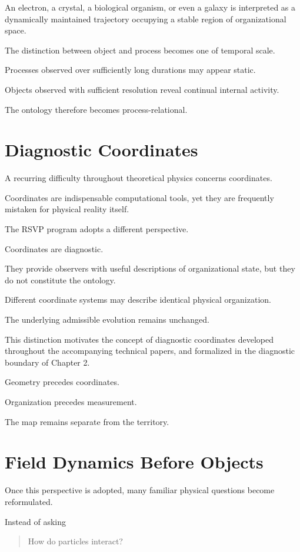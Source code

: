 \documentclass[11pt,oneside]{book}
\numberwithin{equation}{chapter}
\theoremstyle{definition}
\theoremstyle{plain}
\begin{document}
An electron, a crystal, a biological organism, or even a galaxy is
interpreted as a dynamically maintained trajectory occupying a stable
region of organizational space.

The distinction between object and process becomes one of temporal scale.

Processes observed over sufficiently long durations may appear static.

Objects observed with sufficient resolution reveal continual internal
activity.

The ontology therefore becomes process-relational.

\section{Diagnostic Coordinates}

A recurring difficulty throughout theoretical physics concerns coordinates.

Coordinates are indispensable computational tools, yet they are frequently
mistaken for physical reality itself.

The RSVP program adopts a different perspective.

Coordinates are diagnostic.

They provide observers with useful descriptions of organizational state,
but they do not constitute the ontology.

Different coordinate systems may describe identical physical organization.

The underlying admissible evolution remains unchanged.

This distinction motivates the concept of diagnostic coordinates developed
throughout the accompanying technical papers, and formalized in the
diagnostic boundary of Chapter 2.

Geometry precedes coordinates.

Organization precedes measurement.

The map remains separate from the territory.

\section{Field Dynamics Before Objects}

Once this perspective is adopted, many familiar physical questions become
reformulated.

Instead of asking

\begin{quote}
How do particles interact?
\end{quote}
\end{document}
